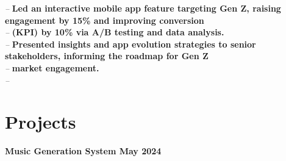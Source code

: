 \documentclass[letterpaper,11pt]{article}
\begin{document}
\textit{} \hfill \textit{ -- }
\vspace{2pt}\textbf{Led an interactive mobile app feature targeting Gen Z, raising engagement by 15\% and improving conversion} \hfill  \\
\textit{} \hfill \textit{ -- }
\vspace{2pt}\textbf{(KPI) by 10\% via A/B testing and data analysis.} \hfill  \\
\textit{} \hfill \textit{ -- }
\vspace{2pt}\textbf{Presented insights and app evolution strategies to senior stakeholders, informing the roadmap for Gen Z} \hfill  \\
\textit{} \hfill \textit{ -- }
\vspace{2pt}\textbf{market engagement.} \hfill  \\
\textit{} \hfill \textit{ -- }
\vspace{2pt}





\section{Projects}
\textbf{Music Generation System May 2024}
\end{document}
